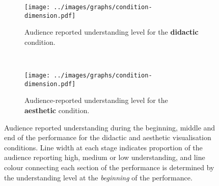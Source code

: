 \begin{figure}
\centering
\begin{subfigure}{\textwidth}
  \centering
  \texttt{[image: ../images/graphs/condition-dimension.pdf]}
  \caption[Didactic condition understanding detailed survey results]{Audience reported understanding level for the \textbf{didactic} condition.}
  \label{fig:didactic-understanding}
\end{subfigure}\\
\begin{subfigure}{\textwidth}
  \centering
  \texttt{[image: ../images/graphs/condition-dimension.pdf]}
  \caption[Aesthetic condition understanding detailed survey results]{Audience-reported understanding level for the \textbf{aesthetic} condition.}
  \label{fig:aesthetic-understanding}
\end{subfigure}

\caption[User study understanding survey responses]{Audience reported understanding during the beginning, middle and end of the performance for the didactic and aesthetic visualisation conditions. Line width at each stage indicates proportion of the audience reporting high, medium or low understanding, and line colour connecting each section of the performance is determined by the understanding level at the \emph{beginning} of the performance.}
\label{fig:user-study-condition-understanding}
\end{figure}